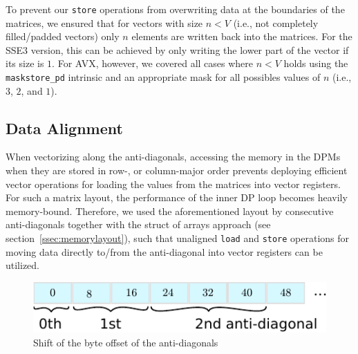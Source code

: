 \documentclass[runningheads,a4paper]{llncs}
\begin{document}
To prevent our \texttt{store} operations from overwriting data at the boundaries
of the matrices, we ensured that for vectors with size $n < V$ (i.e.,
not completely filled/padded vectors) only $n$ elements are written back into the
matrices.  For the SSE3 version, this can be achieved by only writing the lower
part of the vector if its size is $1$.  For AVX, however, we covered all cases
where $n < V$ holds using the \texttt{maskstore\_pd} intrinsic and an appropriate mask
for all possibles values of $n$ (i.e., $3$, $2$, and $1$).

\subsection{Data Alignment}
\label{ssec:dataalignment}

When vectorizing along the anti-diagonals, accessing the memory in the DPMs when they are stored in row-, or column-major order
prevents deploying efficient vector operations for loading the values from the matrices into vector registers. 
For such a matrix layout, the performance of the inner DP loop becomes heavily memory-bound. 
Therefore, we used the aforementioned layout by consecutive anti-diagonals together with the struct of arrays approach (see section~\ref{ssec:memorylayout}), 
such that unaligned \texttt{load} and \texttt{store} operations for moving data directly to/from the anti-diagonal 
into vector registers can be utilized. 


\begin{figure}[ht!]
  \centering
  \includegraphics[scale=0.9]{figures/unaligned.pdf}
  \caption{Shift of the byte offset of the anti-diagonals}
  \label{fig:unaligned}
\end{figure}
\end{document}
